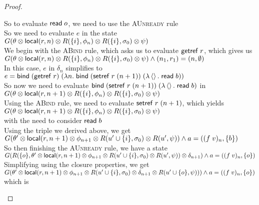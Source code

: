 \begin{proof}
\begin{tabbedproof}
\ooo So to evaluate $\mathsf{read}\; o$, we need to use the \textsc{AUnready} rule \\
\ooo So we need to evaluate $e$ in the state \\
\ooo $G(\theta \otimes \mathsf{local}({r}, {n}) \otimes R(\{{i}\}, \phi_n) \otimes R(\{{i}\}, \sigma_0) \otimes \psi)$ \\
\ooo We begin with the \textsc{ABind} rule, which asks us to evaluate $\mathsf{getref}\; r$, which gives us \\
\ooo $G(\theta \otimes \mathsf{local}({r}, {n}) \otimes R(\{{i}\}, \phi_n) \otimes R(\{{i}\}, \sigma_0) \otimes \psi) \land (n_1,r_1) = (n,\emptyset)$ \\
\ooo In this case, $e$ in $\delta_n$ simplifies to \\
\oooo $e = \mathsf{bind}\; (\mathsf{getref}\; r)\; (\lambda n.\;\mathsf{bind}\; (\mathsf{setref}\; r\;(n+1))\; (\lambda \left<\right>.\;\mathsf{read}\; b))$ \\
\ooo So now we need to evaluate $\mathsf{bind}\; (\mathsf{setref}\; r\;(n+1))\; (\lambda \left<\right>.\;\mathsf{read}\; b)$ in \\
\ooo $G(\theta \otimes \mathsf{local}({r}, {n+1}) \otimes R(\{{i}\}, \phi_n) \otimes R(\{{i}\}, \sigma_0) \otimes \psi)$ \\
\ooo Using the \textsc{ABind} rule, we need to evaluate $\mathsf{setref}\; r\;(n+1)$, which yields  \\
\ooo $G(\theta \otimes \mathsf{local}({r}, {n+1}) \otimes R(\{{i}\}, \phi_n) \otimes R(\{{i}\}, \sigma_0) \otimes \psi)$ \\
\ooo with the need to consider $\mathsf{read}\; b$ \\
\ooo Using the triple we derived above, we get \\
\ooo $G(\theta' \otimes \mathsf{local}({r}, {n+1}) \otimes \phi_{n+1} \otimes R(u' \cup \{{i}\}, \sigma_0) \otimes R(u', \psi))
      \land a = ((f\;v)_n, \{{b}\})$ \\
\ooo So then finishing the \textsc{AUnready} rule, we have a state \\
\ooo $G(R(\{{o}\}, \theta' \otimes \mathsf{local}({r}, {n+1}) \otimes \phi_{n+1} \otimes R(u' \cup \{{i}\}, \sigma_0) \otimes R(u', \psi)) \otimes \delta_{n+1}) \land a = ((f\;v)_n, \{{o}\})$\\
\ooo Simplifying using the closure properties, we get \\
\ooo $G(\theta' \otimes \mathsf{local}({r}, {n+1}) \otimes \phi_{n+1} \otimes R(u' \cup \{{i}\}, \sigma_0) \otimes \delta_{n+1} \otimes R(u' \cup \{{o}\}, \psi))) \land a = ((f\;v)_n, \{{o}\})$\\
\ooo which is \\

\end{tabbedproof}
\end{proof}
